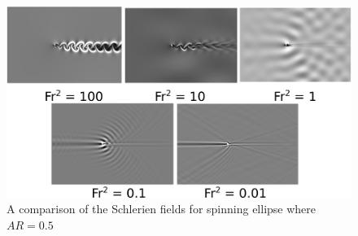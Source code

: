 \begin{figure}
    \centering
    \includegraphics[width=\textwidth]{images/spinning_ellipse/schlerienar0p5.png}
    \caption{A comparison of the Schlerien fields for spinning ellipse where $AR = 0.5$}
    \label{fig:schlerienar0p5}
\end{figure}
